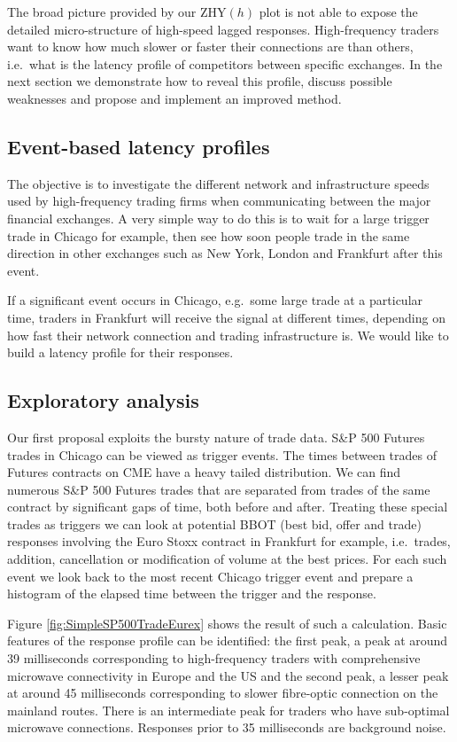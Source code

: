 The broad picture provided by our ZHY$(h)$ plot is not able to expose the detailed micro-structure of high-speed lagged responses. High-frequency traders want to know how much slower or faster their connections are than others, i.e.\ what is the latency profile of competitors between specific exchanges.  In the next section we demonstrate how to reveal this profile, discuss possible weaknesses and propose and implement an improved method.

\subsection{Event-based latency profiles}
The objective is to investigate the different network and infrastructure speeds used by high-frequency trading firms when communicating between the major financial  exchanges. 
A very simple way to do this is to wait for a large trigger trade in Chicago for example, then see how soon people trade in the same direction in other exchanges such as  New York, London and Frankfurt after this
event. 

If a significant event occurs in Chicago, e.g.\ some large trade
at a particular time, traders in Frankfurt will receive the signal
at different times, depending on how fast their network connection and trading infrastructure is. We would like to build
a latency profile for their responses. 

\subsection{Exploratory analysis}
Our first proposal exploits the bursty nature of trade data. S\&P 500 Futures trades in Chicago can be viewed as trigger events. The times between trades of Futures contracts on CME have a heavy tailed distribution. 
We can find numerous S\&P 500 Futures trades that are separated from trades of the same contract by significant gaps of time, both before and after. 
Treating these special trades as triggers we can look at potential BBOT (best bid, offer and trade) responses involving the Euro Stoxx contract in Frankfurt for example, i.e.\ trades, addition, cancellation or modification of volume at the best prices. For each such event we look back to the most recent Chicago trigger event and prepare a histogram of the elapsed time between the trigger and the response. 

Figure \ref{fig:SimpleSP500TradeEurex} shows the result of such a calculation. Basic features of the response profile can be identified: the first peak, a peak at around 39 milliseconds corresponding to high-frequency traders with comprehensive microwave connectivity in Europe and the US and the second  peak, a lesser peak at around 45 milliseconds corresponding to slower fibre-optic connection on the mainland routes. There is an intermediate peak for traders who have sub-optimal microwave connections. Responses prior to 35 milliseconds are background noise. 


